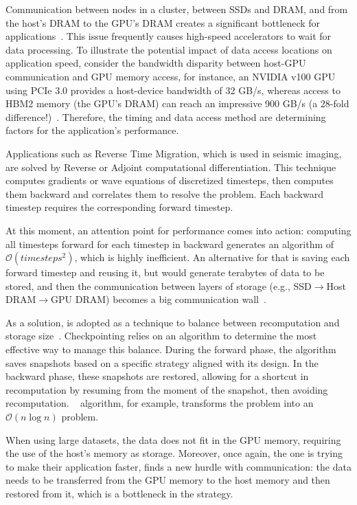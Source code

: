 \documentclass[Ingles]{ic-tese-v3}
\begin{document}
Communication between nodes in a cluster, between SSDs and DRAM, and from the host's DRAM to the GPU's DRAM creates a significant bottleneck for applications~\cite{maurya2024, rigon2024}. This issue frequently causes high-speed accelerators to wait for data processing. To illustrate the potential impact of data access locations on application speed, consider the bandwidth disparity between host-GPU communication and GPU memory access, for instance, an NVIDIA v100 GPU using PCIe 3.0 provides a host-device bandwidth of 32 GB/s, whereas access to HBM2 memory (the GPU's DRAM) can reach an impressive 900 GB/s (a 28-fold difference!)~\cite{v100}. Therefore, the timing and data access method are determining factors for the application's performance.


Applications such as Reverse Time Migration, which is used in seismic imaging, are solved by Reverse or Adjoint computational differentiation. This technique computes gradients or wave equations of discretized timesteps, then computes them backward and correlates them to resolve the problem. Each backward timestep requires the corresponding forward timestep. 

At this moment, an attention point for performance comes into action: computing all timesteps forward for each timestep in backward generates an algorithm of $\mathcal{O}(\textit{timesteps}^2)$, which is highly inefficient. An alternative for that is saving each forward timestep and reusing it, but would generate terabytes of data to be stored, and then the communication between layers of storage (e.g., SSD$\rightarrow$Host DRAM$\rightarrow$GPU DRAM) becomes a big communication wall~\cite{symes2007}.

As a solution, \tit{\checkpointing} is adopted as a technique to balance between recomputation and storage size~\cite{symes2007}. Checkpointing relies on an algorithm to determine the most effective way to manage this balance. During the forward phase, the \checkpointing algorithm saves snapshots based on a specific strategy aligned with its design. In the backward phase, these snapshots are restored, allowing for a shortcut in recomputation by resuming from the moment of the snapshot, then avoiding recomputation. \revolve~\cite{revolve} \checkpointing algorithm, for example, transforms the problem into an $\mathcal{O}(n \log n)$ problem.

When using large datasets, the \checkpointing data does not fit in the GPU memory, requiring the use of the host's memory as storage. Moreover, once again, the one is trying to make their application faster, finds a new hurdle with communication: the data needs to be transferred from the GPU memory to the host memory and then restored from it, which is a bottleneck in the \checkpointing strategy.
\end{document}
